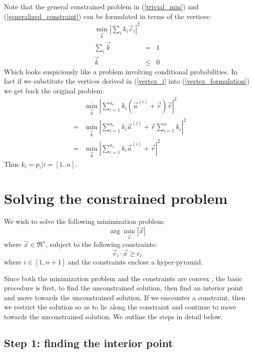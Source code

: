 \documentclass{article}
\begin{document}
Note that the general constrained problem in (\ref{trivial_min}) 
and (\ref{generalized_constraint}) can be formulated in terms of the vertices:
\begin{eqnarray}
	\min_{\vec k} \left |\sum_i k_i \vec c_i \right |^2 & & \label{vertex_formulation}\\
	\sum_i \vec k & = & 1 \\
	\vec k & \le & 0
\end{eqnarray}
Which looks suspiciously like a problem involving conditional probabilities.
In fact if we substitute the vertices derived in (\ref{vertex_i} into 
(\ref{vertex_formulation}) we get back the original problem:
\begin{eqnarray}
	& & \min_{\vec k} \left |\sum_{i=1}^{n_c} k_i (\vec a^{(i)} + \vec r) \vec r \right |^2\\
	& = & \min_{\vec k} \left |\sum_{i=1}^{n_c} k_i \vec a^{(i)} + \vec r \sum_{i=1}^n k_i \right |^2\\
	& = & \min_{\vec k} \left |\sum_{i=1}^{n_c} k_i \vec a^{(i)} + \vec r \right |^2
\end{eqnarray}
Thus $k_i=p_i|i=[1..n]$.

\section{Solving the constrained problem}

We wish to solve the following minimization problem:
\begin{equation}
	\arg \min_{\vec x} |\vec x|
\end{equation}
where $\vec x \in \Re^n$, subject to the following constraints:
\begin{equation}
	\vec v_i \cdot \vec x \ge c_i
\end{equation}
where $i \in [1, n+1]$ and the constraints enclose a hyper-pyramid.

Since both the minimization problem and the constraints are convex 
\citep{Boyd_etal2004}, the basic procedure is first, to find the unconstrained
solution, then find an interior point and move towards the unconstrained
solution. If we encounter a constraint, then we restrict the solution so as
to lie along the constraint and continue to move towards the unconstrained
solution. We outline the steps in detail below.

\subsection{Step 1: finding the interior point}
\end{document}
